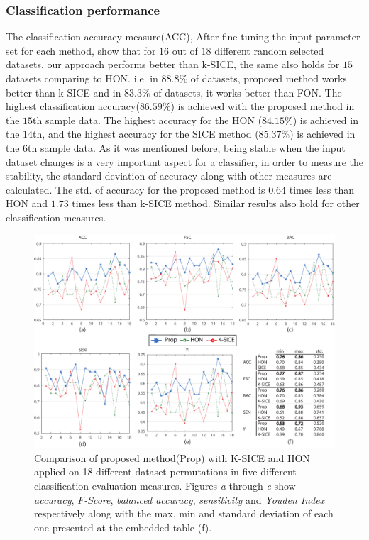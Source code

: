 \documentclass[journal]{IEEEtran}
\begin{document}
	\subsubsection{Classification performance}
	The classification accuracy measure(ACC), After fine-tuning the input parameter set for each method, show that for $16$ out of $18$ different random selected datasets, our approach performs better than k-SICE, the same also holds for $15$ datasets comparing to HON. i.e. in $88.8 \%$ of datasets, proposed method works better than k-SICE and in $83.3 \%$ of datasets, it works better than FON.  
	The highest classification accuracy($86.59\%$) is achieved with the proposed method in the $15$th sample data. The highest accuracy for the HON ($84.15\%$) is achieved in the $14$th, and the highest accuracy for the SICE method ($85.37\%$) is achieved in the $6$th sample data. As it was mentioned before, being stable when the input dataset changes is a very important aspect for a classifier, in order to measure the stability, the standard deviation of accuracy along with other measures are
	calculated. The std. of accuracy for the proposed method is $0.64$ times less than HON and $1.73$ times less than k-SICE method. Similar results also hold for other classification measures.
	\begin{figure}
		\centering
		\includegraphics[width=6in]{images/Final-eps.pdf}
		\caption{
			Comparison of proposed method(Prop) with K-SICE and HON 
			applied on 18 different dataset permutations 
			in five different classification evaluation measures.
			Figures \textit{a} through \textit{e} show \textit{accuracy}, \textit{F-Score}, \textit{balanced accuracy}, \textit{sensitivity} and \textit{Youden Index} respectively
			along with the max, min and standard deviation of each one presented at the embedded table (f). 
		}
		\label{g3.2}
	\end{figure}
	
\end{document}
